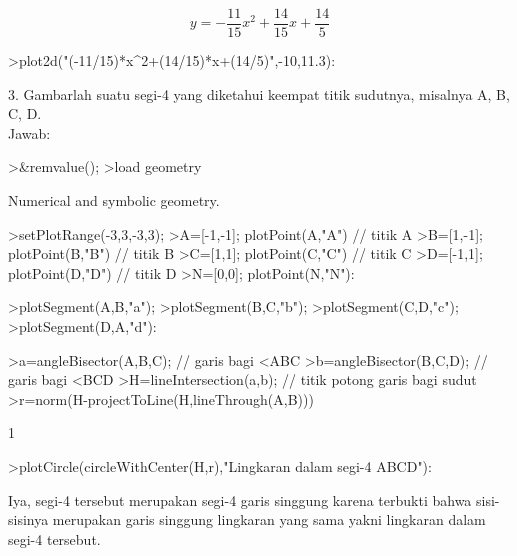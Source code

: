 \documentclass{article}
\begin{document}
\begin{eulernotebook}
\begin{eulercomment}
\begin{eulercomment}
\begin{eulercomment}
\begin{eulercomment}
\begin{eulerformula}
\[
y= {-}\frac{11}{15}x^2+ \frac{14}{15}x+ \frac{14}{5}
\]
\end{eulerformula}
\begin{eulerprompt}
>plot2d("(-11/15)*x^2+(14/15)*x+(14/5)",-10,11.3):
\end{eulerprompt}
\begin{eulercomment}
3. Gambarlah suatu segi-4 yang diketahui keempat titik sudutnya,
misalnya A, B, C, D.\\
Jawab:
\end{eulercomment}
\begin{eulerprompt}
>&remvalue();
>load geometry
\end{eulerprompt}
\begin{euleroutput}
  Numerical and symbolic geometry.
\end{euleroutput}
\begin{eulerprompt}
>setPlotRange(-3,3,-3,3);
>A=[-1,-1]; plotPoint(A,"A") // titik A
>B=[1,-1]; plotPoint(B,"B") // titik B
>C=[1,1]; plotPoint(C,"C") // titik C
>D=[-1,1]; plotPoint(D,"D") // titik D
>N=[0,0]; plotPoint(N,"N"):
\end{eulerprompt}
\begin{eulerprompt}
>plotSegment(A,B,"a");
>plotSegment(B,C,"b");
>plotSegment(C,D,"c");
>plotSegment(D,A,"d"):
\end{eulerprompt}
\begin{eulerprompt}
>a=angleBisector(A,B,C); // garis bagi <ABC
>b=angleBisector(B,C,D); // garis bagi <BCD
>H=lineIntersection(a,b); // titik potong garis bagi sudut
>r=norm(H-projectToLine(H,lineThrough(A,B)))
\end{eulerprompt}
\begin{euleroutput}
  1
\end{euleroutput}
\begin{eulerprompt}
>plotCircle(circleWithCenter(H,r),"Lingkaran dalam segi-4 ABCD"):
\end{eulerprompt}
\begin{eulercomment}
Iya, segi-4 tersebut merupakan segi-4 garis singgung karena terbukti
bahwa sisi-sisinya merupakan garis singgung lingkaran yang sama yakni
lingkaran dalam segi-4 tersebut.

\end{eulercomment}
\end{eulercomment}
\end{eulercomment}
\end{eulercomment}
\end{eulercomment}
\end{eulernotebook}
\end{document}

